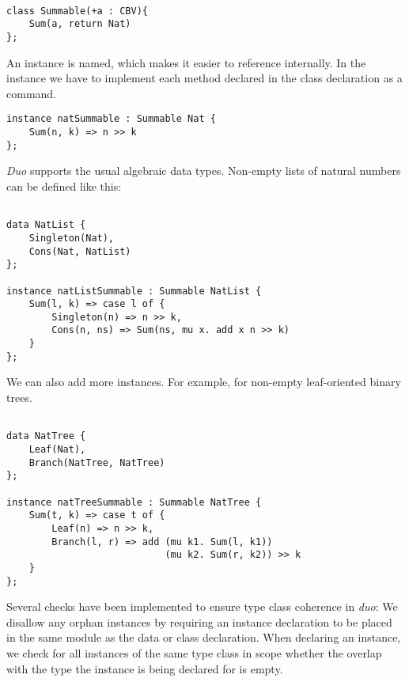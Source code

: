 \begin{lstlisting}[style=duostyle, label=code:duo-class-decl, captionpos=b, caption={Type class declaration  in \emph{duo}}]

class Summable(+a : CBV){
    Sum(a, return Nat)
};

\end{lstlisting}

An instance is named, which makes it easier to reference internally.
In the instance we have to implement each method declared in the class declaration as a command.

\begin{lstlisting}[style=duostyle, label=code:duo-nat-list, captionpos=b, caption={Instance declaration for natural numbers in \emph{duo}}]
instance natSummable : Summable Nat {
    Sum(n, k) => n >> k
};
\end{lstlisting}

\emph{Duo} supports the usual algebraic data types. Non-empty lists of natural numbers can be defined like this:

\begin{lstlisting}[style=duostyle, label=code:duo-nat-list-two, captionpos=b, caption={Data and instance declaration for non-empty lists of in \emph{duo}}]

data NatList {
    Singleton(Nat),
    Cons(Nat, NatList)
};

instance natListSummable : Summable NatList {
    Sum(l, k) => case l of {
        Singleton(n) => n >> k,
        Cons(n, ns) => Sum(ns, mu x. add x n >> k)
    }
};

\end{lstlisting}

We can also add more instances. For example, for non-empty leaf-oriented binary trees.

\begin{lstlisting}[style=duostyle, label=code:duo-tree-instance, captionpos=b, caption={Type class example  in \emph{duo}}]

data NatTree {
    Leaf(Nat),
    Branch(NatTree, NatTree)
};

instance natTreeSummable : Summable NatTree {
    Sum(t, k) => case t of {
        Leaf(n) => n >> k,
        Branch(l, r) => add (mu k1. Sum(l, k1))
                            (mu k2. Sum(r, k2)) >> k
    }
};

\end{lstlisting}

Several checks have been implemented to ensure type class coherence in \emph{duo}:
We disallow any orphan instances by requiring an instance declaration to be placed in the same module as the data or class declaration.
When declaring an instance, we check for all instances of the same type class in scope whether the overlap with the type the instance is being declared for is empty.


